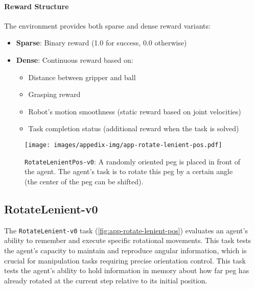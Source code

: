\paragraph{Reward Structure} The environment provides both sparse and dense reward variants:
\begin{itemize}
    \item \textbf{Sparse}: Binary reward (1.0 for success, 0.0 otherwise)
    \item \textbf{Dense}: Continuous reward based on:
    \begin{itemize}
        \item Distance between gripper and ball
        \item Grasping reward
        \item Robot's motion smoothness (static reward based on joint velocities)
        \item Task completion status (additional reward when the task is solved)
    \end{itemize}
\end{itemize}


\newpage
\begin{figure*}[h!]
    \centering
    \texttt{[image: images/appedix-img/app-rotate-lenient-pos.pdf]}
    \vspace{-15pt}
    \caption{\texttt{RotateLenientPos-v0}: A randomly oriented peg is placed in front of the agent. The agent's task is to rotate this peg by a certain angle (the center of the peg can be shifted).}
    \label{fig:app-rotate-lenient-pos}
    \vspace{-15pt}
\end{figure*}
\subsection{RotateLenient-v0}
\label{app:rotate-lenient}

The \texttt{RotateLenient-v0} task (\autoref{fig:app-rotate-lenient-pos}) evaluates an agent's ability to remember and execute specific rotational movements. This task tests the agent's capacity to maintain and reproduce angular information, which is crucial for manipulation tasks requiring precise orientation control. This task tests the agent's ability to hold information in memory about how far peg has already rotated at the current step 
relative to its initial position.

